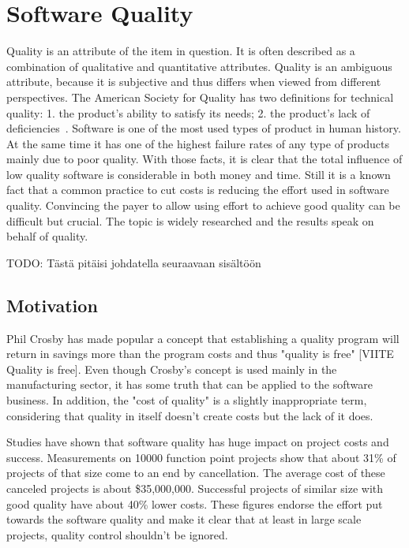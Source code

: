 \section{Software Quality}

Quality is an attribute of the item in question. It is often described as a combination of qualitative and quantitative attributes. Quality is an ambiguous attribute, because it is subjective and thus differs when viewed from different perspectives. The American Society for Quality has two definitions for technical quality: 1. the product's ability to satisfy its needs; 2. the product's lack of deficiencies~\cite{ASQglossary}. Software is one of the most used types of product in human history. At the same time it has one of the highest failure rates of any type of products mainly due to poor quality. With those facts, it is clear that the total influence of low quality software is considerable in both money and time. Still it is a known fact that a common practice to cut costs is reducing the effort used in software quality. Convincing the payer to allow using effort to achieve good quality can be difficult but crucial. The topic is widely researched and the results speak on behalf of quality.

TODO: Tästä pitäisi johdatella seuraavaan sisältöön

\subsection{Motivation}

Phil Crosby has made popular a concept that establishing a quality program will return in savings more than the program costs and thus "quality is free" [VIITE Quality is free]. Even though Crosby's concept is used mainly in the manufacturing sector, it has some truth that can be applied to the software business.  In addition, the "cost of quality" is a slightly inappropriate term, considering that quality in itself doesn't create costs but the lack of it does. 

Studies have shown that software quality has huge impact on project costs and success. Measurements on 10000 function point projects show that about 31\% of projects of that size come to an end by cancellation. The average cost of these canceled projects is about \$35,000,000. Successful projects of similar size with good quality have about 40\% lower costs. These figures endorse the effort put towards the software quality and make it clear that at least in large scale projects, quality control shouldn't be ignored.

